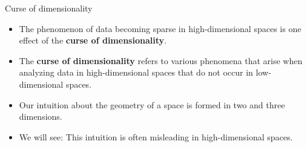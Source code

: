 \documentclass[11pt,compress,t,notes=noshow, xcolor=table]{beamer}
\begin{document}
    

\begin{vbframe}{Curse of dimensionality}


\begin{itemize}
\item The phenomenon of data becoming sparse in high-dimensional spaces is one effect of the \textbf{curse of dimensionality}.
\item The \textbf{curse of dimensionality} refers to various phenomena that arise when analyzing data in high-dimensional spaces that do not occur in low-dimensional spaces.
\item Our intuition about the geometry of a space is formed in two and three dimensions. 
\item We will see: This intuition is often misleading in high-dimensional spaces.
\end{itemize}

\end{vbframe}
\end{document}
